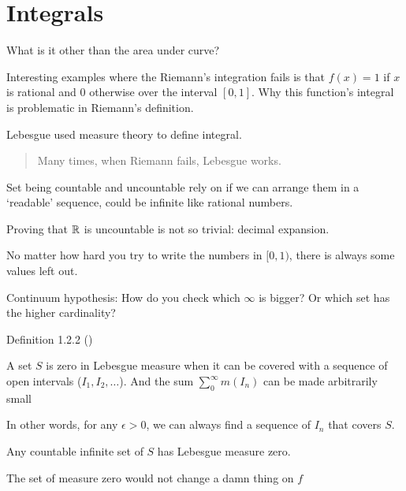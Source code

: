 \clearpage

\section{Integrals}

What is it other than the area under curve?

Interesting examples where the Riemann's integration fails is that
$f(x) = 1$ if $x$ is rational and $0$ otherwise over the interval $[0,1]$.
Why this function's integral is problematic in Riemann's definition.

Lebesgue used measure theory to define integral.

\begin{quote}
	Many times, when Riemann fails, Lebesgue works.
\end{quote}

Set being countable and uncountable rely on if we can arrange them in
a `readable' sequence, could be infinite like rational numbers.

Proving that $\mathbb{R}$ is uncountable is not so trivial: decimal expansion.

No matter how hard you try to write the numbers in $[0,1)$,
there is always some values left out.

Continuum hypothesis: How do you check which $\infty$ is bigger?
Or which set has the higher cardinality?

Definition 1.2.2 ()

\begin{example}
	A set $S$ is zero in Lebesgue measure
	when it can be covered with a sequence of open intervals ($I_1, I_2, \dots$).
	And the sum $\sum_{0}^{\infty} m(I_n)$ can be made arbitrarily small
\end{example}

In other words, for any $\epsilon > 0$, we can always find a sequence of $I_n$
that covers $S$.

\begin{thm}
	Any countable infinite set of $S$ has Lebesgue measure zero.
\end{thm}

\begin{remark}
	The set of measure zero would not change a damn thing on $f$
\end{remark}
